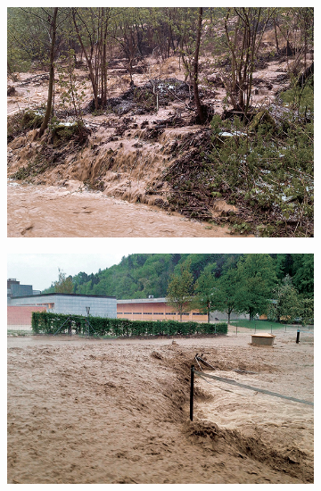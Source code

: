 \documentclass[xcolor=dvipsnames, USenglish]{beamer}  %
\begin{document}
\begin{frame}
    \begin{figure}
      \centering
      \begin{subfigure}[b]{0.25\textwidth}
        \includegraphics[width=\textwidth]{img/overlandflow1.jpg}
        \label{subfig:ovflow1}
      \end{subfigure}
      \quad
      \begin{subfigure}[b]{0.25\textwidth}
        \includegraphics[width=\textwidth]{img/overlandflow2.jpg}
        \label{subfig:ovflow2}
      \end{subfigure}
      

\end{figure}
\end{frame}
\end{document}
